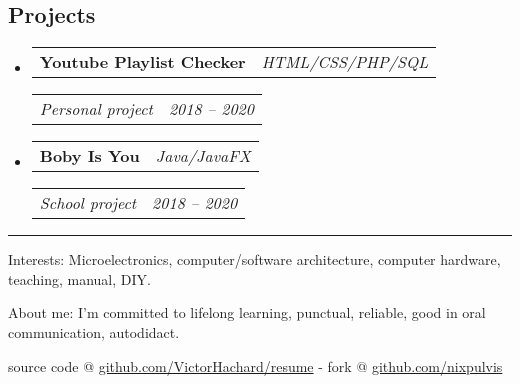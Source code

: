 \documentclass[10pt,letterpaper]{article}
\makeatletter
\newenvironment{indentsection}[1]
{\begin{list}{}
  {\setlength{\leftmargin}{#1}} \item[]
}
{\end{list}}
\newcommand{\headerrow}[2]
{\begin{tabular*}{\linewidth}{l@{\extracolsep{\fill}}r}
  #1 &
  #2 \\
\end{tabular*}}
\makeatother
\begin{document}
\subsection*{Projects}
\begin{itemize}
  \parskip=0.1em

  \item
    \headerrow
      {\textbf{Youtube Playlist Checker}}
      {\emph{HTML/CSS/PHP/SQL}}
    \headerrow
      {\emph{Personal project}}
      {\emph{2018 -- 2020}}
    \item
    \headerrow
      {\textbf{Boby Is You}}
      {\emph{Java/JavaFX}}
    \headerrow
      {\emph{School project}}
      {\emph{2018 -- 2020}}
  \end{itemize}


\hrule
\begin{indentsection}{\parindent}
\begin{description*}
\item[Interests:]
  Microelectronics, computer/software architecture, computer hardware, teaching,
  manual, DIY.
\item[About me:]
  I’m committed to lifelong learning, punctual, reliable,
  good in oral communication, autodidact.
\end{description*}
\end{indentsection}


\begin{center}
\footnotesize source code @
\href{http://www.github.com/VictorHachard/resume}
{github.com/VictorHachard/resume} - fork @
\href{http://www.github.com/nixpulvis}
{github.com/nixpulvis}
\end{center}
\end{document}
